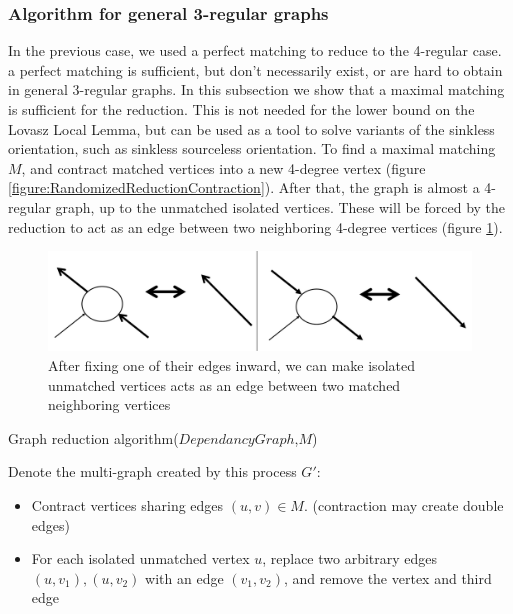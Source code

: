 \subsubsection{Algorithm for general 3-regular graphs}

In the previous case, we used a perfect matching to reduce to the 4-regular case. a perfect matching is sufficient, but don't necessarily exist, or are hard to obtain in general $3$-regular graphs. In this subsection we show that a maximal matching is sufficient for the reduction. This is not needed for the lower bound on the Lovasz Local Lemma, but can be used as a tool to solve variants of the sinkless orientation, such as sinkless sourceless orientation. To find a maximal matching $M$, and contract matched vertices into a new 4-degree vertex (figure \ref{figure:RandomizedReductionContraction}). After that, the graph is almost a 4-regular graph, up to the unmatched isolated vertices. These will be forced by the reduction to act as an edge between two neighboring 4-degree vertices (figure \ref{figure:RandIsoVert}). 

\begin{figure}[h]
	\centering
	\includegraphics[width=1.0\textwidth]{img/RandomizedReductionIsolatedVertex}
	\caption{After fixing one of their edges inward, we can make isolated unmatched vertices acts as an edge between two matched neighboring vertices}
	\label{figure:RandIsoVert}
\end{figure}
\begin{algorithm}[H]\label{Graph reduction algorithm}\small
\caption{\small Graph reduction algorithm($DependancyGraph$,$M$)}
Denote the multi-graph created by this process $G'$:
\begin{itemize}
\item Contract vertices sharing edges $(u,v) \in M$. (contraction may create double edges)
\item For each isolated unmatched vertex $u$, replace two arbitrary edges $(u,v_1),(u,v_2)$ with an edge $(v_1,v_2)$, and remove the vertex and third edge
\end{itemize}
\end{algorithm}



